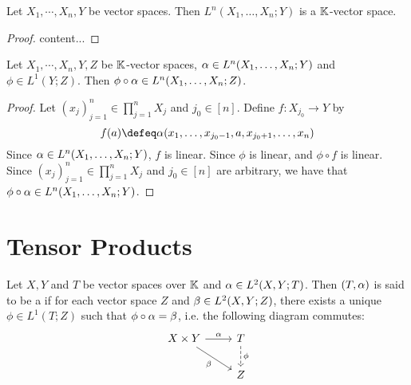 \documentclass{book}
\begin{document}
	\begin{defn}
	\end{defn}

	\begin{ex}
		Let $X_1, \cdots, X_n, Y$ be vector spaces. Then $L^n(X_1, \ldots, X_n;Y)$ is a $\mathbb{K}$-vector space.
	\end{ex}

	\begin{proof}
		content...
	\end{proof}

	\begin{ex}
		Let $X_1, \cdots, X_n, Y, Z$ be $\mathbb{K}$-vector spaces, $\alpha \in L^n(X_1, \ldots, X_n;Y)$ and $\phi \in L^1(Y;Z)$. Then $\phi \circ \alpha \in L^n(X_1, \ldots, X_n; Z)$. 
	\end{ex}

	\begin{proof}
		Let $(x_j)_{j=1}^n \in \prod\limits_{j=1}^n X_j$ and $j_0 \in [n]$. Define $f:X_{j_0} \rightarrow Y$ by 
		$$f(a) \defeq \al(x_1, \ldots, x_{j_0-1}, a , x_{j_0+1}, \ldots, x_n) $$
		Since $\alpha \in L^n(X_1, \ldots, X_n;Y)$, $f$ is linear. Since $\phi$ is linear, and $\phi \circ f$ is linear. Since $(x_j)_{j=1}^n \in \prod\limits_{j=1}^n X_j$ and $j_0 \in [n]$ are arbitrary, we have that $\phi \circ \alpha \in L^n(X_1, \ldots, X_n;Y)$. 
	\end{proof}

	








































	\newpage
	\section{Tensor Products}
	
	\begin{defn}
		Let $X, Y$ and $T$ be vector spaces over $\mathbb{K}$ and $\alpha \in L^2(X, Y; T)$. Then $(T, \alpha)$ is said to be a  if for each vector space $Z$ and $\beta \in L^2(X, Y; Z)$, there exists a unique $\phi \in L^1(T;Z)$ such that $\phi \circ \alpha = \beta$, i.e. the following diagram commutes:
		\[ 
		\begin{tikzcd}
			X \times Y \arrow[r, "\al"] \arrow[dr, "\be"'] 	
			& T  \arrow[d, dashed, "\phi"] \\
			& Z 
		\end{tikzcd}
		\] 
	\end{defn}
	
\end{document}
